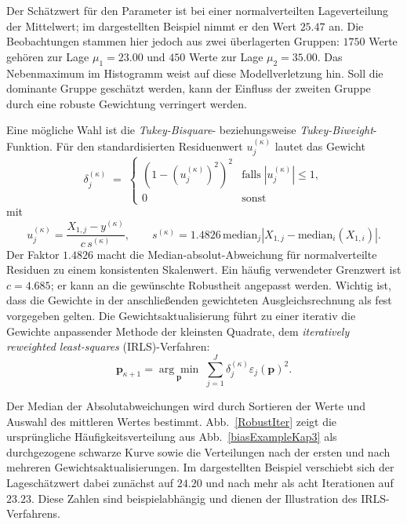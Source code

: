 Der Schätzwert für den Parameter ist bei einer normalverteilten Lageverteilung
der Mittelwert; im dargestellten Beispiel nimmt er den Wert $25.47$ an. Die
Beobachtungen stammen hier jedoch aus zwei überlagerten Gruppen: $1750$ Werte
gehören zur Lage $\mu_1=23.00$ und $450$ Werte zur Lage $\mu_2=35.00$.
Das Nebenmaximum im Histogramm weist auf diese Modellverletzung hin. Soll die
dominante Gruppe geschätzt werden, kann der Einfluss der zweiten Gruppe durch
eine robuste Gewichtung verringert werden.

Eine mögliche Wahl ist die \textsl{Tukey-Bisquare}- beziehungsweise
\textsl{Tukey-Biweight}-Funktion. Für den standardisierten Residuenwert
$u_j^{(\kappa)}$ lautet das Gewicht
\begin{equation}
\delta_j^{(\kappa)} \; = \;
\left\{ \begin{array}{cl}
\left(1-\left(u_j^{(\kappa)}\right)^2\right)^2 &
\mathrm{falls}\; |u_j^{(\kappa)}|\leq 1,\\
0 & \mathrm{sonst}
\end{array} \right.
\end{equation}
mit
\begin{equation}
u_j^{(\kappa)}
=\frac{X_{1,j}-y^{(\kappa)}}{c\,s^{(\kappa)}},
\qquad
s^{(\kappa)}
=1.4826\,\mathrm{median}_j
\left|X_{1,j}-\mathrm{median}_i(X_{1,i})\right|.
\end{equation}
Der Faktor $1.4826$ macht die Median-absolut-Abweichung für normalverteilte
Residuen zu einem konsistenten Skalenwert. Ein häufig verwendeter Grenzwert ist
$c=4.685$; er kann an die gewünschte Robustheit angepasst werden. Wichtig ist,
dass die Gewichte in der anschließenden gewichteten Ausgleichsrechnung als
fest vorgegeben gelten. Die Gewichtsaktualisierung führt zu einer iterativ 
die Gewichte anpassender Methode der kleinsten Quadrate, dem
\textsl{iteratively reweighted least-squares} (IRLS)-Verfahren:
\begin{equation}
\mathbf{p}_{\kappa+1}
=\underset{\mathbf p}{\arg\min}\;
\sum_{j=1}^J\delta_j^{(\kappa)}
\varepsilon_j(\mathbf p)^2.
\label{robustEstim2}
\end{equation}

Der Median der Absolutabweichungen wird durch Sortieren der Werte und Auswahl
des mittleren Wertes bestimmt. Abb.~\ref{RobustIter} zeigt die ursprüngliche
Häufigkeitsverteilung aus Abb.~\ref{biasExampleKap3} als durchgezogene schwarze
Kurve sowie die Verteilungen nach der ersten und nach mehreren
Gewichtsaktualisierungen. Im dargestellten Beispiel verschiebt sich der
Lageschätzwert dabei zunächst auf $24.20$ und nach mehr als acht Iterationen
auf $23.23$. Diese Zahlen sind beispielabhängig und dienen der Illustration
des IRLS-Verfahrens.
